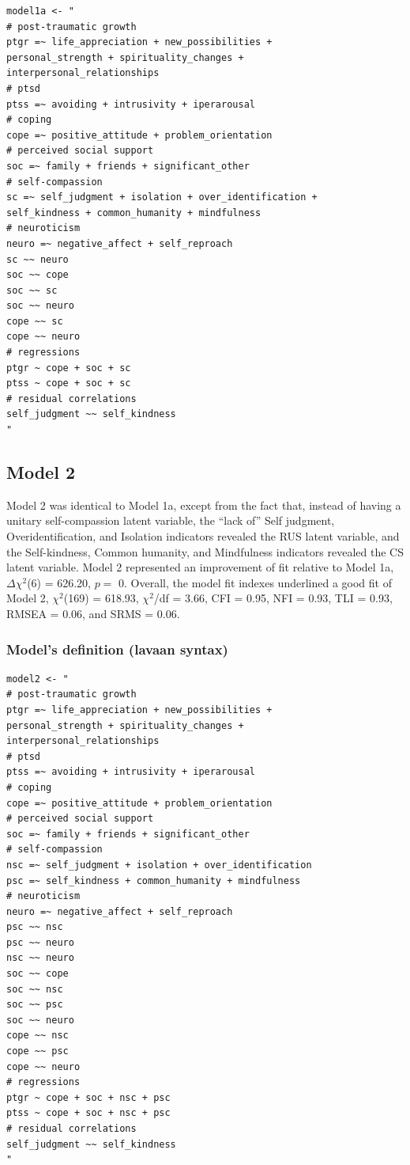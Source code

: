 \documentclass[
  english,
  man,floatsintext]{apa7}
\begin{document}
\begin{appendix}
\begin{verbatim}
model1a <- "
# post-traumatic growth
ptgr =~ life_appreciation + new_possibilities + 
personal_strength + spirituality_changes + 
interpersonal_relationships
# ptsd
ptss =~ avoiding + intrusivity + iperarousal
# coping
cope =~ positive_attitude + problem_orientation 
# perceived social support
soc =~ family + friends + significant_other
# self-compassion
sc =~ self_judgment + isolation + over_identification +
self_kindness + common_humanity + mindfulness
# neuroticism
neuro =~ negative_affect + self_reproach
sc ~~ neuro
soc ~~ cope
soc ~~ sc
soc ~~ neuro
cope ~~ sc
cope ~~ neuro
# regressions
ptgr ~ cope + soc + sc 
ptss ~ cope + soc + sc 
# residual correlations
self_judgment ~~ self_kindness
"
\end{verbatim}

\newpage

\hypertarget{model-2}{%
\subsection{Model 2}\label{model-2}}

Model 2 was identical to Model 1a, except from the fact that, instead of
having a unitary self-compassion latent variable, the ``lack of'' Self
judgment, Overidentification, and Isolation indicators revealed the RUS
latent variable, and the Self-kindness, Common humanity, and Mindfulness
indicators revealed the CS latent variable. Model 2 represented an
improvement of fit relative to Model 1a, \(\Delta \chi^2\)(6) = 626.20,
\(p =\) 0. Overall, the model fit indexes underlined a good fit of Model
2, \(\chi^2\)(169) = 618.93, \(\chi^2\)/df = 3.66, CFI = 0.95, NFI =
0.93, TLI = 0.93, RMSEA = 0.06, and SRMS = 0.06.

\hypertarget{models-definition-lavaan-syntax-3}{%
\subsubsection{Model's definition (lavaan
syntax)}\label{models-definition-lavaan-syntax-3}}

\begin{verbatim}
model2 <- "
# post-traumatic growth
ptgr =~ life_appreciation + new_possibilities + 
personal_strength + spirituality_changes + 
interpersonal_relationships
# ptsd
ptss =~ avoiding + intrusivity + iperarousal
# coping
cope =~ positive_attitude + problem_orientation 
# perceived social support
soc =~ family + friends + significant_other
# self-compassion
nsc =~ self_judgment + isolation + over_identification
psc =~ self_kindness + common_humanity + mindfulness
# neuroticism
neuro =~ negative_affect + self_reproach
psc ~~ nsc
psc ~~ neuro
nsc ~~ neuro
soc ~~ cope
soc ~~ nsc
soc ~~ psc
soc ~~ neuro
cope ~~ nsc
cope ~~ psc
cope ~~ neuro
# regressions
ptgr ~ cope + soc + nsc + psc 
ptss ~ cope + soc + nsc + psc 
# residual correlations
self_judgment ~~ self_kindness
"
\end{verbatim}


\end{appendix}
\end{document}
